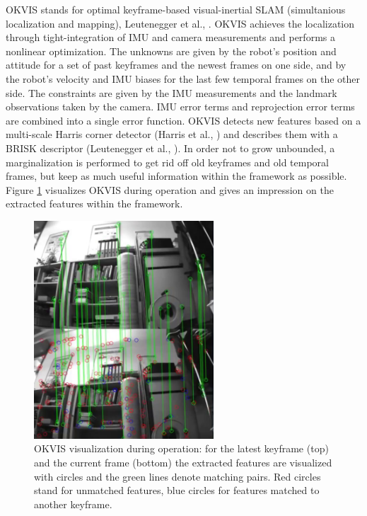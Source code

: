 OKVIS stands for optimal keyframe-based visual-inertial SLAM (simultanious localization and mapping), Leutenegger et al., \cite{leutenegger2015keyframe}. OKVIS achieves the localization through tight-integration of IMU and camera measurements and performs a nonlinear optimization. The unknowns are given by the robot's position and attitude for a set of past keyframes and the newest frames on one side, and by the robot's velocity and IMU biases for the last few temporal frames on the other side. The constraints are given by the IMU measurements and the landmark observations taken by the camera. IMU error terms and reprojection error terms are combined into a single error function. OKVIS detects new features based on a multi-scale Harris corner detector (Harris et al., \cite{harris1988combined}) and describes them with a BRISK descriptor (Leutenegger et al., \cite{leutenegger2011brisk}). In order not to grow unbounded, a marginalization is performed to get rid off old keyframes and old temporal frames, but keep as much useful information within the framework as possible. Figure \ref{pics:okvis_frontend} visualizes OKVIS during operation and gives an impression on the extracted features within the framework.

\begin{figure}[h]
   \centering
   \includegraphics[width=0.6\textwidth]{images/okvis_frontend.png}
   \caption{OKVIS visualization during operation: for the latest keyframe (top) and the current frame (bottom) the extracted features are visualized with circles and the green lines denote matching pairs. Red circles stand for unmatched features, blue circles for features matched to another keyframe.}
   \label{pics:okvis_frontend}
\end{figure}

